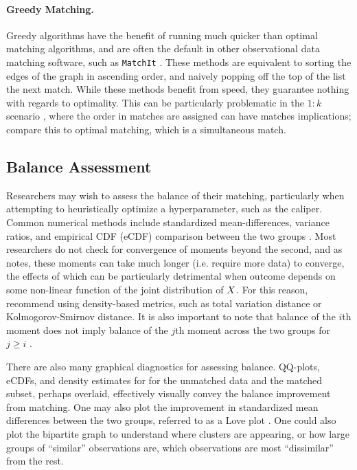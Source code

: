 \documentclass[11pt]{extarticle}
\begin{document}
\paragraph{Greedy Matching.} Greedy algorithms have the benefit of running much quicker than optimal matching algorithms, and are often the default in other observational data matching software, such as \texttt{MatchIt} \parencite{ho_matchit_2011}. These methods are equivalent to sorting the edges of the graph in ascending order, and naively popping off the top of the list the next match. While these methods benefit from speed, they guarantee nothing with regards to optimality. This can be particularly problematic in the $1:k$ scenario \cite{rosenbaum_central_1983}, where the order in matches are assigned can have matches implications; compare this to optimal matching, which is a simultaneous match.

\subsection{Balance Assessment}

Researchers may wish to assess the balance of their matching, particularly when attempting to heuristically optimize a hyperparameter, such as the caliper. Common numerical methods include standardized mean-differences, variance ratios, and empirical CDF (eCDF) comparison between the two groups \parencite{greifer_assessing_2022}. Most researchers do not check for convergence of moments beyond the second, and as \textcite{basu_use_2008} notes, these moments can take much longer (i.e. require more data) to converge, the effects of which can be particularly detrimental when outcome depends on some non-linear function of the joint distribution of $X$. For this reason, \textcite{zhu_kernel-based_2018} recommend using density-based metrics, such as total variation distance or Kolmogorov-Smirnov distance. It is also important to note that balance of the $i$th moment does not imply balance of the $j$th moment across the two groups for $j \geq i$ \parencite{garrido_methods_2014}.

There are also many graphical diagnostics for assessing balance. QQ-plots, eCDFs, and density estimates for for the unmatched data and the matched subset, perhaps overlaid, effectively visually convey the balance improvement from matching. One may also plot the improvement in standardized mean differences between the two groups, referred to as a Love plot \parencite{greifer_assessing_2022}. One could also plot the bipartite graph to understand where clusters are appearing, or how large groups of ``similar'' observations are, which observations are most ``dissimilar'' from the rest.
\end{document}
